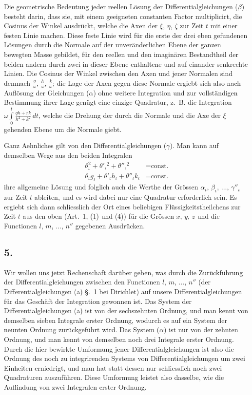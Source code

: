 \documentclass[12pt,a4paper]{article}
\begin{document}
Die geometrische Bedeutung jeder reellen Lösung der Differentialgleichungen ($\beta$) besteht darin, dass sie, mit einem geeigneten constanten Factor multiplicirt, die Cosinus der Winkel ausdrückt, welche die Axen der $\xi$, $\eta$, $\zeta$ zur Zeit $t$ mit einer festen Linie machen. Diese feste Linie wird für die erste der drei eben gefundenen Lösungen durch die Normale auf der unveränderlichen Ebene der ganzen bewegten Masse gebildet, für den reellen und den imaginären Bestandtheil der beiden andern durch zwei in dieser Ebene enthaltene und auf einander senkrechte Linien. Die Cosinus der Winkel zwischen den Axen und jener Normalen sind demnach $\frac{g}{\omega}$, $\frac{h}{\omega}$, $\frac{k}{\omega}$; die Lage der Axen gegen diese Normale ergiebt sich also nach Auflösung der Gleichungen ($\alpha$) ohne weitere Integration und zur vollständigen Bestimmung ihrer Lage genügt eine einzige Quadratur, z.~B. die Integration $\omega\int\limits_0^t\!\frac{qh + rk}{h^2 + k^2}\,dt$, welche die Drehung der durch die Normale und die Axe der $\xi$ gehenden Ebene um die Normale giebt.

Ganz Aehnliches gilt von den Differentialgleichungen ($\gamma$). Man kann auf demselben Wege aus den beiden Integralen
\begin{align*}
\tag{VI} \theta_\iota^2 + \theta'_\iota{}^2 + \theta''_{\iota}{}^2 &= \text{const.}\\
\tag{VII} \theta_\iota g_\iota + \theta'_\iota h_\iota + \theta''_{\iota} k_\iota &= \text{const.}
\end{align*}
ihre allgemeine Lösung und folglich auch die Werthe der Grössen $\alpha_\iota$, $\beta_\iota$, $\ldots$, $\gamma''_{\iota}$ zur Zeit $t$ ableiten, und es wird dabei nur eine Quadratur erforderlich sein. Es ergiebt sich dann schliesslich der Ort eines beliebigen Flüssigkeitstheilchens zur Zeit $t$ aus den oben (Art.~1, (1) und (4)) für die Grössen $x$, $y$, $z$ und die Functionen $l$, $m$, $\ldots$, $n''$ gegebenen Ausdrücken.

\subsection*{5.}

Wir wollen uns jetzt Rechenschaft darüber geben, was durch die Zurückführung der Differentialgleichungen zwischen den Functionen $l$, $m$, $\ldots$, $n''$ (der Differentialgleichungen (a) \S.~1 bei Dirichlet) auf unsere Differentialgleichungen für das Geschäft der Integration gewonnen ist. Das System der Differentialgleichungen (a) ist von der sechszehnten Ordnung, und man kennt von demselben sieben Integrale erster Ordnung, wodurch es auf ein System der neunten Ordnung zurückgeführt wird. Das System ($\alpha$) ist nur von der zehnten Ordnung, und man kennt von demselben noch drei Integrale erster Ordnung. Durch die hier bewirkte Umformung jener Differentialgleichungen ist also die Ordnung des noch zu integrirenden Systems von Differentialgleichungen um zwei Einheiten erniedrigt, und man hat statt dessen nur schliesslich noch zwei Quadraturen auszuführen. Diese Umformung leistet also dasselbe, wie die Auffindung von zwei Integralen erster Ordnung.
\end{document}
